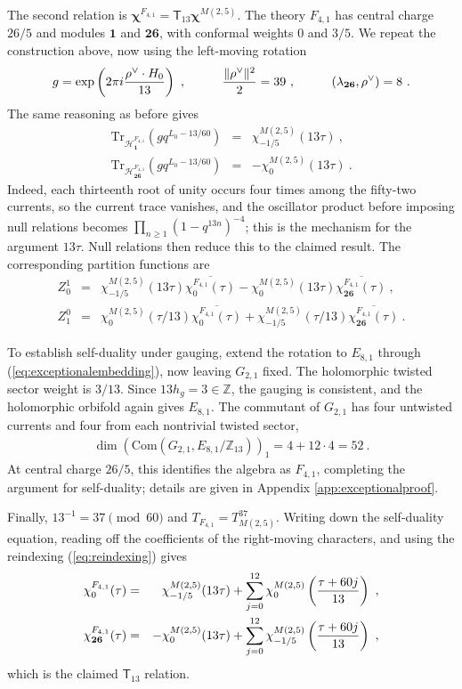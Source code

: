 \documentclass[12pt]{article}
\numberwithin{equation}{section}
\newcommand{\bea}{\begin{eqnarray}}
\newcommand{\eea}{\end{eqnarray}}
\def\no{\nonumber}
\def\ZZ{\mathbb{Z}}
\newcommand{\Tr}{\mathrm{Tr}}
\theoremstyle{remark}
\begin{document}
The second relation is $\boldsymbol{\chi}^{F_{4,1}}=\mathsf T_{13}\boldsymbol{\chi}^{M(2,5)}$. The theory $F_{4,1}$ has central charge $26/5$ and modules $\mathbf1$ and $\mathbf{26}$, with conformal weights $0$ and $3/5$. We repeat the construction above, now using the left-moving rotation
\bea 
g=\exp\left(2\pi i{\rho^\vee\cdot H_0\over 13}\right)~,
\hspace{0.4 in}
{\|\rho^\vee\|^2\over 2}=39~,
\hspace{0.4 in}
(\lambda_{\mathbf{26}},\rho^\vee)=8~.
\eea
The same reasoning as before gives
\bea \label{eq:FfourTwining}
\Tr_{\mathcal H^{F_{4,1}}_{\mathbf1}}\left(gq^{L_0-13/60}\right)&=&\chi^{M(2,5)}_{-1/5}(13\tau)~,\no\\
\Tr_{\mathcal H^{F_{4,1}}_{\mathbf{26}}}\left(gq^{L_0-13/60}\right)&=&-\chi^{M(2,5)}_0(13\tau)~.
\eea
Indeed, each thirteenth root of unity occurs four times among the fifty-two currents, so the current trace vanishes, and the oscillator product before imposing null relations becomes $\prod_{n\geq1}(1-q^{13n})^{-4}$; this is the mechanism for the argument $13\tau$. Null relations then reduce this to the claimed result.
The corresponding partition functions are
\bea
Z^1_0&=&\chi^{M(2,5)}_{-1/5}(13\tau)\overline{\chi^{F_{4,1}}_0(\tau)}-\chi^{M(2,5)}_0(13\tau)\overline{\chi^{F_{4,1}}_{\mathbf{26}}(\tau)}~,\no\\
Z^0_1&=&\chi^{M(2,5)}_0(\tau/13)\overline{\chi^{F_{4,1}}_0(\tau)}+\chi^{M(2,5)}_{-1/5}(\tau/13)\overline{\chi^{F_{4,1}}_{\mathbf{26}}(\tau)}~.
\eea

To establish self-duality under gauging, extend the rotation to $E_{8,1}$ through (\ref{eq:exceptionalembedding}), now leaving $G_{2,1}$ fixed. The holomorphic twisted sector weight is $3/13$. Since $13h_g=3\in \ZZ$, the gauging is consistent, and the holomorphic orbifold again gives $E_{8,1}$. The commutant of $G_{2,1}$ has four untwisted currents and four from each nontrivial twisted sector,
\bea
\dim\left(\mathrm{Com}(G_{2,1},E_{8,1}/\ZZ_{13})\right)_1=4+12\cdot4=52~.
\eea
At central charge $26/5$, this identifies the algebra as $F_{4,1}$, completing the argument for self-duality; details are given in Appendix \ref{app:exceptionalproof}.

Finally, $13^{-1}=37\pmod{60}$ and $T_{F_{4,1}}=T_{M(2,5)}^{37}$. Writing down the self-duality equation, reading off the coefficients of the right-moving characters, and using the reindexing (\ref{eq:reindexing}) gives
\bea
\chi^{F_{4,1}}_0(\tau)&=&\chi^{M(2,5)}_{-1/5}(13\tau)+\sum_{j=0}^{12}\chi^{M(2,5)}_0\left({\tau+60j\over 13}\right)~,\no\\
\chi^{F_{4,1}}_{\mathbf{26}}(\tau)&=&-\chi^{M(2,5)}_0(13\tau)+\sum_{j=0}^{12}\chi^{M(2,5)}_{-1/5}\left({\tau+60j\over 13}\right)~,
\eea
which is the claimed $\mathsf T_{13}$ relation.
\end{document}
